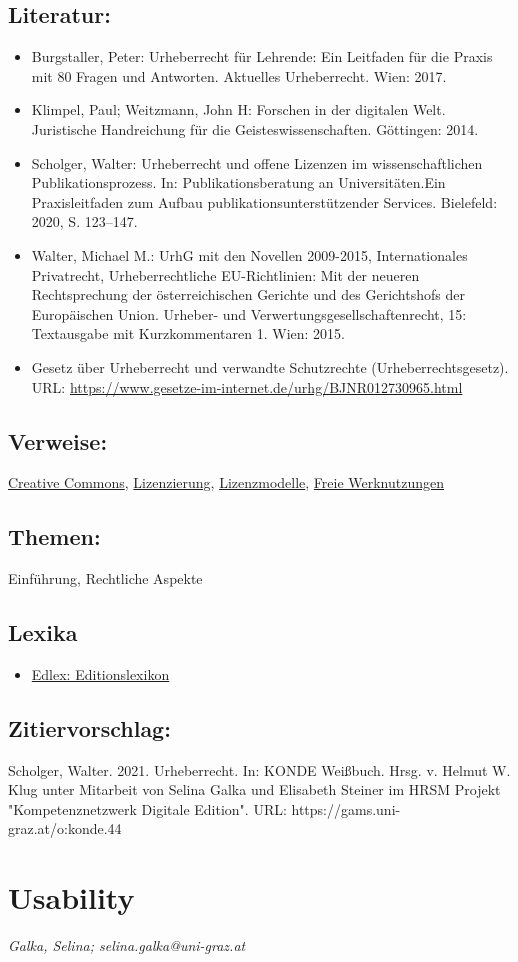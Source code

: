 \documentclass{article}
\begin{document}
        \subsection*{Literatur:}\begin{itemize}\item Burgstaller, Peter: Urheberrecht für Lehrende: Ein Leitfaden für die Praxis mit 80 Fragen und Antworten. Aktuelles Urheberrecht. Wien: 2017.\item Klimpel, Paul; Weitzmann, John H: Forschen in der digitalen Welt. Juristische Handreichung für die Geisteswissenschaften. Göttingen: 2014.\item Scholger, Walter: Urheberrecht und offene Lizenzen im wissenschaftlichen Publikationsprozess. In: Publikationsberatung an Universitäten.Ein Praxisleitfaden zum Aufbau publikationsunterstützender Services. Bielefeld: 2020, S. 123–147.\item Walter, Michael M.: UrhG mit den Novellen 2009-2015, Internationales Privatrecht, Urheberrechtliche EU-Richtlinien: Mit der neueren Rechtsprechung der österreichischen Gerichte und des Gerichtshofs der Europäischen Union. Urheber- und Verwertungsgesellschaftenrecht‚ 15: Textausgabe mit Kurzkommentaren 1. Wien: 2015.\item Gesetz über Urheberrecht und verwandte Schutzrechte (Urheberrechtsgesetz). URL: \url{https://www.gesetze-im-internet.de/urhg/BJNR012730965.html}\end{itemize}\subsection*{Verweise:}\href{https://gams.uni-graz.at/o:konde.45}{Creative Commons}, \href{https://gams.uni-graz.at/o:konde.119}{Lizenzierung}, \href{https://gams.uni-graz.at/o:konde.9}{Lizenzmodelle}, \href{https://gams.uni-graz.at/o:konde.222}{Freie Werknutzungen}\subsection*{Themen:}Einführung, Rechtliche Aspekte\subsection*{Lexika}\begin{itemize}\item \href{https://edlex.de/index.php?title=Urheberrecht}{Edlex: Editionslexikon}\end{itemize}\subsection*{Zitiervorschlag:}Scholger, Walter. 2021. Urheberrecht. In: KONDE Weißbuch. Hrsg. v. Helmut W. Klug unter Mitarbeit von Selina Galka und Elisabeth Steiner im HRSM Projekt "Kompetenznetzwerk Digitale Edition". URL: https://gams.uni-graz.at/o:konde.44\newpage\section*{Usability} \emph{Galka, Selina; selina.galka@uni-graz.at }\\
        
\end{document}
